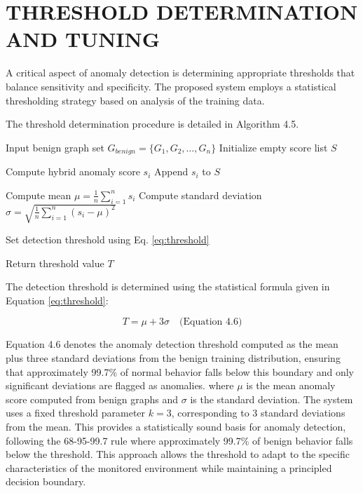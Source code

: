 \section{\uppercase{THRESHOLD DETERMINATION AND TUNING}}

A critical aspect of anomaly detection is determining appropriate thresholds that balance sensitivity and specificity. The proposed system employs a statistical thresholding strategy based on analysis of the training data.

The threshold determination procedure is detailed in Algorithm 4.5.

\begin{algorithm}[H]
\caption{Statistical Threshold Determination}
\begin{algorithmic}[1]

\State Input benign graph set $G_{benign} = \{G_1, G_2, \ldots, G_n\}$
\State Initialize empty score list $S$


\State Compute hybrid anomaly score $s_i$
\State Append $s_i$ to $S$

\EndFor

\State Compute mean $\mu = \frac{1}{n}\sum_{i=1}^{n} s_i$
\State Compute standard deviation $\sigma = \sqrt{\frac{1}{n}\sum_{i=1}^{n}(s_i - \mu)^2}$

\State Set detection threshold using Eq. \ref{eq:threshold}

\State Return threshold value $T$

\end{algorithmic}
\end{algorithm}

The detection threshold is determined using the statistical formula given in Equation \ref{eq:threshold}:

\begin{equation}
T = \mu + 3\sigma \quad \text{(Equation 4.6)}
\label{eq:threshold}
\end{equation}

Equation 4.6 denotes the anomaly detection threshold computed as the mean plus three standard deviations from the benign training distribution, ensuring that approximately 99.7\% of normal behavior falls below this boundary and only significant deviations are flagged as anomalies. where $\mu$ is the mean anomaly score computed from benign graphs and $\sigma$ is the standard deviation. The system uses a fixed threshold parameter $k = 3$, corresponding to 3 standard deviations from the mean. This provides a statistically sound basis for anomaly detection, following the 68-95-99.7 rule where approximately 99.7\% of benign behavior falls below the threshold. This approach allows the threshold to adapt to the specific characteristics of the monitored environment while maintaining a principled decision boundary.



